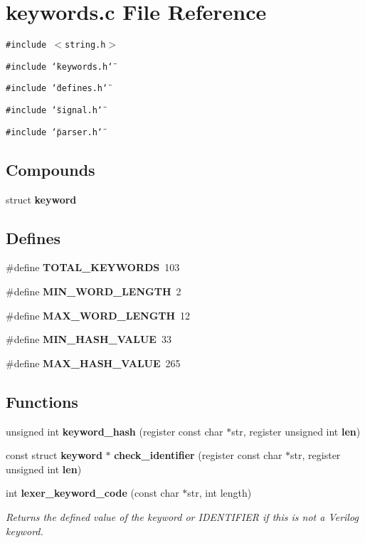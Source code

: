 \section{keywords.c File Reference}
\label{keywords_8c}
{\tt \#include $<$string.h$>$}\par
{\tt \#include \char`\"{}keywords.h\char`\"{}}\par
{\tt \#include \char`\"{}defines.h\char`\"{}}\par
{\tt \#include \char`\"{}signal.h\char`\"{}}\par
{\tt \#include \char`\"{}parser.h\char`\"{}}\par
\subsection*{Compounds}
\begin{CompactItemize}
\item 
struct {\bf keyword}
\end{CompactItemize}
\subsection*{Defines}
\begin{CompactItemize}
\item 
\#define {\bf TOTAL\_\-KEYWORDS}\ 103
\item 
\#define {\bf MIN\_\-WORD\_\-LENGTH}\ 2
\item 
\#define {\bf MAX\_\-WORD\_\-LENGTH}\ 12
\item 
\#define {\bf MIN\_\-HASH\_\-VALUE}\ 33
\item 
\#define {\bf MAX\_\-HASH\_\-VALUE}\ 265
\end{CompactItemize}
\subsection*{Functions}
\begin{CompactItemize}
\item 
unsigned int {\bf keyword\_\-hash} (register const char $\ast$str, register unsigned int {\bf len})
\item 
const struct {\bf keyword} $\ast$ {\bf check\_\-identifier} (register const char $\ast$str, register unsigned int {\bf len})
\item 
int {\bf lexer\_\-keyword\_\-code} (const char $\ast$str, int length)
\begin{CompactList}\small\item\em Returns the defined value of the keyword or IDENTIFIER if this is not a Verilog keyword.\item\end{CompactList}\end{CompactItemize}


